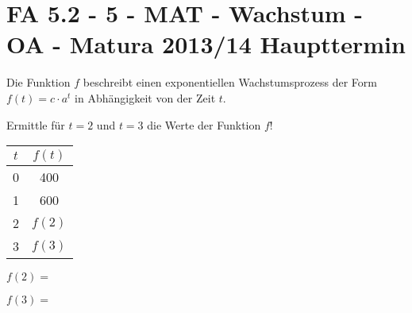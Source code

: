 \section{FA 5.2 - 5 - MAT - Wachstum - OA - Matura 2013/14 Haupttermin}

\begin{beispiel}{1} %
			Die Funktion $f$ beschreibt einen exponentiellen Wachstumsprozess der Form $f(t)=c\cdot a^t$ in Abhängigkeit von der Zeit $t$.
			
			Ermittle für $t=2$ und $t=3$ die Werte der Funktion $f$!
			
			\begin{center}
			\begin{tabular}{|c|c|}\hline
			$t$&$f(t)$\\ \hline
			0&400\\ \hline
			1&600\\ \hline
			2&$f(2)$\\ \hline
			3&$f(3)$\\ \hline			
			\end{tabular}
			\end{center}
			
			$f(2)=$ \leer
			
			$f(3)=$ 
\end{beispiel}